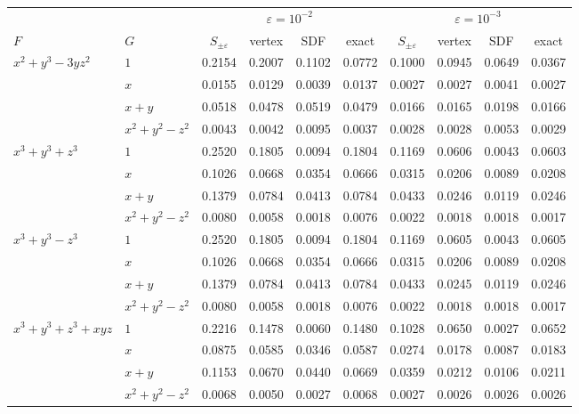 \documentclass[12pt, a4paper]{article}
\theoremstyle{plain}
\theoremstyle{definition}
\theoremstyle{remark}
\theoremstyle{definition}
\begin{document}
\begin{table}[!ht]
\centering
\footnotesize
\setlength{\tabcolsep}{4pt}
\begin{adjustbox}{max width=\textwidth}
\begin{tabular}{l l c c c c c c c c}
\toprule
& & \multicolumn{4}{c}{$\varepsilon=10^{-2}$} & \multicolumn{4}{c}{$\varepsilon=10^{-3}$} \\
\cmidrule(lr){3-6}\cmidrule(lr){7-10}
$F$ & $G$ & $S_{\pm\varepsilon}$ & vertex & SDF & exact & $S_{\pm\varepsilon}$ & vertex & SDF & exact \\
\midrule
$x^2+y^3-3yz^2$ & $1$ & 0.2154 & 0.2007 & 0.1102 & 0.0772 & 0.1000 & 0.0945 & 0.0649 & 0.0367 \\
 & $x$ & 0.0155 & 0.0129 & 0.0039 & 0.0137 & 0.0027 & 0.0027 & 0.0041 & 0.0027 \\
 & $x+y$ & 0.0518 & 0.0478 & 0.0519 & 0.0479 & 0.0166 & 0.0165 & 0.0198 & 0.0166 \\
 & $x^2+y^2-z^2$ & 0.0043 & 0.0042 & 0.0095 & 0.0037 & 0.0028 & 0.0028 & 0.0053 & 0.0029 \\
\midrule
$x^3+y^3+z^3$ & $1$ & 0.2520 & 0.1805 & 0.0094 & 0.1804 & 0.1169 & 0.0606 & 0.0043 & 0.0603 \\
 & $x$ & 0.1026 & 0.0668 & 0.0354 & 0.0666 & 0.0315 & 0.0206 & 0.0089 & 0.0208 \\
 & $x+y$ & 0.1379 & 0.0784 & 0.0413 & 0.0784 & 0.0433 & 0.0246 & 0.0119 & 0.0246 \\
 & $x^2+y^2-z^2$ & 0.0080 & 0.0058 & 0.0018 & 0.0076 & 0.0022 & 0.0018 & 0.0018 & 0.0017 \\
\midrule
$x^3+y^3-z^3$ & $1$ & 0.2520 & 0.1805 & 0.0094 & 0.1804 & 0.1169 & 0.0605 & 0.0043 & 0.0605 \\
 & $x$ & 0.1026 & 0.0668 & 0.0354 & 0.0666 & 0.0315 & 0.0206 & 0.0089 & 0.0208 \\
 & $x+y$ & 0.1379 & 0.0784 & 0.0413 & 0.0784 & 0.0433 & 0.0245 & 0.0119 & 0.0246 \\
 & $x^2+y^2-z^2$ & 0.0080 & 0.0058 & 0.0018 & 0.0076 & 0.0022 & 0.0018 & 0.0018 & 0.0017 \\
\midrule
$x^3+y^3+z^3+xyz$ & $1$ & 0.2216 & 0.1478 & 0.0060 & 0.1480 & 0.1028 & 0.0650 & 0.0027 & 0.0652 \\
 & $x$ & 0.0875 & 0.0585 & 0.0346 & 0.0587 & 0.0274 & 0.0178 & 0.0087 & 0.0183 \\
 & $x+y$ & 0.1153 & 0.0670 & 0.0440 & 0.0669 & 0.0359 & 0.0212 & 0.0106 & 0.0211 \\
 & $x^2+y^2-z^2$ & 0.0068 & 0.0050 & 0.0027 & 0.0068 & 0.0027 & 0.0026 & 0.0026 & 0.0026 \\

\end{tabular}
\end{adjustbox}
\end{table}
\end{document}
